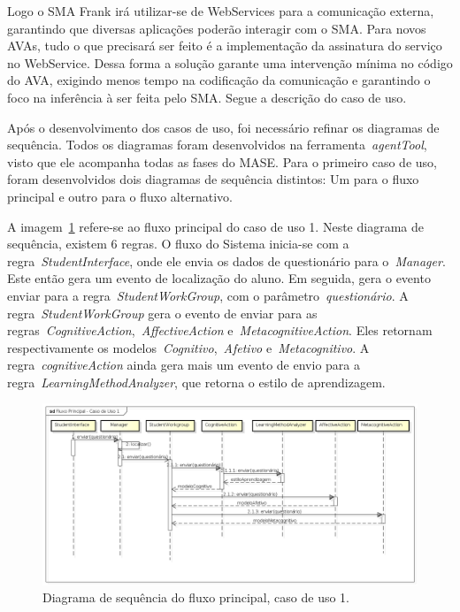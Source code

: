 Logo o SMA Frank irá utilizar-se de WebServices para a comunicação externa, garantindo que diversas aplicações poderão interagir com o SMA. Para novos AVAs, tudo o que precisará ser feito é a implementação da assinatura do serviço no WebService. Dessa forma a solução garante uma intervenção mínima no código do AVA, exigindo menos tempo na codificação da comunicação e garantindo o foco na inferência à ser feita pelo SMA. Segue a descrição do caso de uso.



Após o desenvolvimento dos casos de uso, foi necessário refinar os diagramas de sequência. Todos os diagramas foram desenvolvidos na ferramenta~\emph{agentTool}, visto que ele acompanha todas as fases do MASE. Para o primeiro caso de uso, foram desenvolvidos dois diagramas de sequência distintos: Um para o fluxo principal e outro para o fluxo alternativo.

A imagem~\ref{fig:dss-uc1-fluxo-principal} refere-se ao fluxo principal do caso de uso 1. Neste diagrama de sequência, existem 6 regras. O fluxo do Sistema inicia-se com a regra~\emph{StudentInterface}, onde ele envia os dados de questionário para o~\emph{Manager}. Este então gera um evento de localização do aluno. Em seguida, gera o evento enviar para a regra~\emph{StudentWorkGroup}, com o parâmetro~\emph{questionário}. A regra~\emph{StudentWorkGroup} gera o evento de enviar para as regras~\emph{CognitiveAction},~\emph{AffectiveAction} e~\emph{MetacognitiveAction}. Eles retornam respectivamente os modelos~\emph{Cognitivo},~\emph{Afetivo} e~\emph{Metacognitivo}. A regra~\emph{cognitiveAction} ainda gera mais um evento de envio para a regra~\emph{LearningMethodAnalyzer}, que retorna o estilo de aprendizagem.

\begin{figure}
	\centering
	\includegraphics[scale=0.48]{images/dss-uc1-fluxo-principal.png}
	\caption{Diagrama de sequência do fluxo principal, caso de uso 1.}
	\label{fig:dss-uc1-fluxo-principal}
\end{figure}

